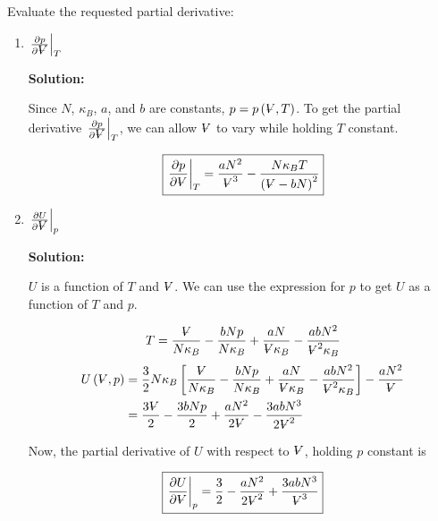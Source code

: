 \documentclass[10pt]{article}
\newenvironment{Solution}
    {\textbf{Solution:}
    
    \vspace{5mm}
    \begin{tcolorbox}
    }
    {
    \end{tcolorbox}
    \vspace{5mm}
    }
\newcommand{\vol}{{\ooalign{\hfil$V$\hfil\cr\kern0.08em--\hfil\cr}}}
\begin{document}
\begin{enumerate}
Evaluate the requested partial derivative: 

\begin{enumerate}
    \item $\left.\frac{\partial p}{\partial \vol}\right|_T$
    
    
    \begin{Solution}
    Since $N$, $\kappa_B$, $a$, and $b$ are constants, $p = p\left(\vol, T\right)$. To get the partial derivative $\left.\frac{\partial p}{\partial \vol}\right|_T$, we can allow $\vol$ to vary while holding $T$ constant.
    
    \begin{equation}
    \boxed{
        \left.\frac{\partial p}{\partial \vol}\right|_T =  \frac{a N^2}{\vol^3} - \frac{N\kappa_B T}{\left(\vol -b N\right)^2}
    }
    \end{equation}
    
    \end{Solution}

    \item $\left.\frac{\partial U}{\partial \vol}\right|_p$
    

    \begin{Solution}
    $U$ is a function of $T$ and $\vol$. We can use the expression for $p$ to get $U$ as a function of $T$ and $p$. 
    
    \begin{equation}
        T = \frac{\vol}{N\kappa_B} -\frac{b N p}{N\kappa_B} +  \frac{a N}{\vol\kappa_B} - \frac{a b N^2}{\vol^2\kappa_B}
    \end{equation}
    \begin{align}
        U\left(\vol, p\right) &= \frac{3}{2} N \kappa_B \left[\frac{\vol}{N\kappa_B} -\frac{b N p}{N\kappa_B} + \frac{a N}{\vol\kappa_B} - \frac{a b N^2}{\vol^2\kappa_B}\right] - \frac{a N^2}{\vol}
        \\
        &= \frac{3\vol}{2} - \frac{3 b N p}{2} + \frac{ a N^2}{2 \vol} - \frac{3 a b N^3}{2 \vol^2} 
    \end{align}

    Now, the partial derivative of $U$ with respect to $\vol$, holding $p$ constant is 
    
    \begin{equation}
       \boxed{
       \left.\frac{\partial U}{\partial \vol}\right|_p = \frac{3}{2} - \frac{ a N^2}{2 \vol^2} + \frac{3 a b N^3}{ \vol^3}
       }
    \end{equation}


\end{Solution}
\end{enumerate}
\end{enumerate}
\end{document}
